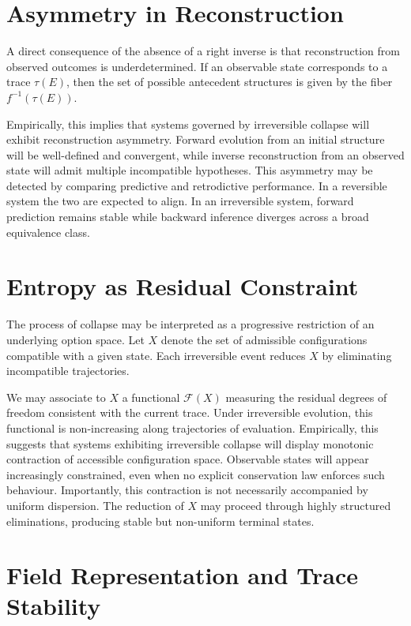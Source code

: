 \documentclass[12pt, oneside]{amsbook}
\theoremstyle{plain}
\theoremstyle{definition}
\theoremstyle{remark}
\newcommand{\trace}{\tau}
\newcommand{\preimgset}[1]{f^{-1}(#1)}
\newcommand{\entropyF}{\mathcal{F}}
\begin{document}
\section{Asymmetry in Reconstruction}
\label{sec:empirical:asymmetry}

A direct consequence of the absence of a right inverse is that reconstruction
from observed outcomes is underdetermined. If an observable state corresponds
to a trace $\trace(E)$, then the set of possible antecedent structures is given
by the fiber $\preimgset{\trace(E)}$.

Empirically, this implies that systems governed by irreversible collapse will
exhibit reconstruction asymmetry. Forward evolution from an initial structure
will be well-defined and convergent, while inverse reconstruction from an
observed state will admit multiple incompatible hypotheses. This asymmetry may
be detected by comparing predictive and retrodictive performance. In a
reversible system the two are expected to align. In an irreversible system,
forward prediction remains stable while backward inference diverges across a
broad equivalence class.

\section{Entropy as Residual Constraint}
\label{sec:empirical:entropy}

The process of collapse may be interpreted as a progressive restriction of an
underlying option space. Let $X$ denote the set of admissible configurations
compatible with a given state. Each irreversible event reduces $X$ by
eliminating incompatible trajectories.

We may associate to $X$ a functional $\entropyF(X)$ measuring the residual
degrees of freedom consistent with the current trace. Under irreversible
evolution, this functional is non-increasing along trajectories of evaluation.
Empirically, this suggests that systems exhibiting irreversible collapse will
display monotonic contraction of accessible configuration space. Observable
states will appear increasingly constrained, even when no explicit conservation
law enforces such behaviour. Importantly, this contraction is not necessarily
accompanied by uniform dispersion. The reduction of $X$ may proceed through
highly structured eliminations, producing stable but non-uniform terminal
states.

\section{Field Representation and Trace Stability}
\label{sec:empirical:fields}
\end{document}
